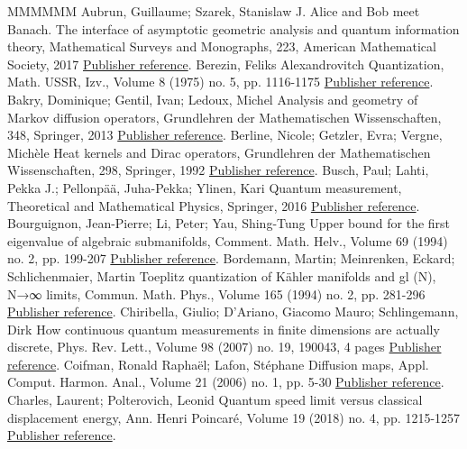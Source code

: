 \documentclass[11pt]{article}
\theoremstyle{definition}
\numberwithin{equation}{section}
\numberwithin{figure}{section}
\numberwithin{table}{section}
\newcommand\< {\mathcal{h}}
\renewcommand\> {\mathcal{i}}
\begin{document}
\begin{thebibliography}{MMMMMM}
 Aubrun, Guillaume; Szarek, Stanislaw J. Alice and Bob meet Banach. The interface of asymptotic geometric analysis and quantum information theory, Mathematical Surveys and Monographs, 223, American Mathematical Society, 2017 \href{https://ahl.centre-mersenne.org/item/AHL_2020__3__1343_0/#AS}{Publisher reference}.
 Berezin, Feliks Alexandrovitch Quantization, Math. USSR, Izv., Volume 8 (1975) no. 5, pp. 1116-1175 \href{https://ahl.centre-mersenne.org/item/AHL_2020__3__1343_0/#B}{Publisher reference}.
 Bakry, Dominique; Gentil, Ivan; Ledoux, Michel Analysis and geometry of Markov diffusion operators, Grundlehren der Mathematischen Wissenschaften, 348, Springer, 2013 \href{https://ahl.centre-mersenne.org/item/AHL_2020__3__1343_0/#Bak}{Publisher reference}.
 Berline, Nicole; Getzler, Evra; Vergne, Michèle Heat kernels and Dirac operators, Grundlehren der Mathematischen Wissenschaften, 298, Springer, 1992 \href{https://ahl.centre-mersenne.org/item/AHL_2020__3__1343_0/#BGV04}{Publisher reference}.
 Busch, Paul; Lahti, Pekka J.; Pellonpää, Juha-Pekka; Ylinen, Kari Quantum measurement, Theoretical and Mathematical Physics, Springer, 2016 \href{https://ahl.centre-mersenne.org/item/AHL_2020__3__1343_0/#Busch-2}{Publisher reference}.
 Bourguignon, Jean-Pierre; Li, Peter; Yau, Shing-Tung Upper bound for the first eigenvalue of algebraic submanifolds, Comment. Math. Helv., Volume 69 (1994) no. 2, pp. 199-207 \href{https://ahl.centre-mersenne.org/item/AHL_2020__3__1343_0/#BLY94}{Publisher reference}.
 Bordemann, Martin; Meinrenken, Eckard; Schlichenmaier, Martin Toeplitz quantization of Kähler manifolds and  gl (N), N→∞ limits, Commun. Math. Phys., Volume 165 (1994) no. 2, pp. 281-296 \href{https://ahl.centre-mersenne.org/item/AHL_2020__3__1343_0/#BMS}{Publisher reference}.
 Chiribella, Giulio; D’Ariano, Giacomo Mauro; Schlingemann, Dirk How continuous quantum measurements in finite dimensions are actually discrete, Phys. Rev. Lett., Volume 98 (2007) no. 19, 190043, 4 pages \href{https://ahl.centre-mersenne.org/item/AHL_2020__3__1343_0/#CDS}{Publisher reference}.
 Coifman, Ronald Raphaël; Lafon, Stéphane Diffusion maps, Appl. Comput. Harmon. Anal., Volume 21 (2006) no. 1, pp. 5-30 \href{https://ahl.centre-mersenne.org/item/AHL_2020__3__1343_0/#CoL}{Publisher reference}.
 Charles, Laurent; Polterovich, Leonid Quantum speed limit versus classical displacement energy, Ann. Henri Poincaré, Volume 19 (2018) no. 4, pp. 1215-1257 \href{https://ahl.centre-mersenne.org/item/AHL_2020__3__1343_0/#CP1}{Publisher reference}.

\end{thebibliography}
\end{document}
